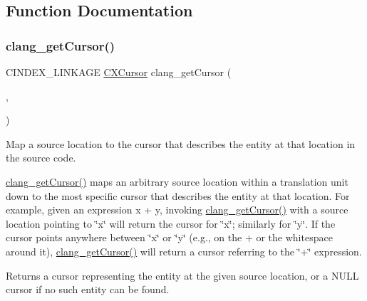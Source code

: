 \subsection{Function Documentation}
\mbox{\label{group__CINDEX__CURSOR__SOURCE_ga30a9972c7e099ab2735fa6c45e247ec8}} 
\subsubsection{\texorpdfstring{clang\+\_\+get\+Cursor()}{clang\_getCursor()}}
{\footnotesize\ttfamily C\+I\+N\+D\+E\+X\+\_\+\+L\+I\+N\+K\+A\+GE \mbox{\hyperlink{structCXCursor}{C\+X\+Cursor}} clang\+\_\+get\+Cursor (\begin{DoxyParamCaption}\item[{\mbox{\hyperlink{group__CINDEX_gacdb7815736ca709ce9a5e1ec2b7e16ac}{C\+X\+Translation\+Unit}}}]{,  }\item[{\mbox{\hyperlink{structCXSourceLocation}{C\+X\+Source\+Location}}}]{ }\end{DoxyParamCaption})}



Map a source location to the cursor that describes the entity at that location in the source code. 

\mbox{\hyperlink{group__CINDEX__CURSOR__SOURCE_ga30a9972c7e099ab2735fa6c45e247ec8}{clang\+\_\+get\+Cursor()}} maps an arbitrary source location within a translation unit down to the most specific cursor that describes the entity at that location. For example, given an expression {\ttfamily x} + y, invoking \mbox{\hyperlink{group__CINDEX__CURSOR__SOURCE_ga30a9972c7e099ab2735fa6c45e247ec8}{clang\+\_\+get\+Cursor()}} with a source location pointing to \char`\"{}x\char`\"{} will return the cursor for \char`\"{}x\char`\"{}; similarly for \char`\"{}y\char`\"{}. If the cursor points anywhere between \char`\"{}x\char`\"{} or \char`\"{}y\char`\"{} (e.\+g., on the + or the whitespace around it), \mbox{\hyperlink{group__CINDEX__CURSOR__SOURCE_ga30a9972c7e099ab2735fa6c45e247ec8}{clang\+\_\+get\+Cursor()}} will return a cursor referring to the \char`\"{}+\char`\"{} expression.

\begin{DoxyReturn}{Returns}
a cursor representing the entity at the given source location, or a N\+U\+LL cursor if no such entity can be found. 
\end{DoxyReturn}
\mbox{\label{group__CINDEX__CURSOR__SOURCE_ga79f6544534ab73c78a8494c4c0bc2840}} 
